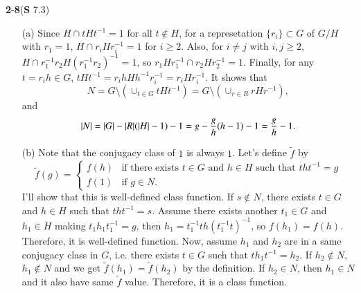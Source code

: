 \documentclass[a4paper, 12pt]{article}
\theoremstyle{Mydefinition}
\theoremstyle{Mytheorem}
\begin{document}
\noindent \textbf{2}-\textbf{8}(\textbf{S} 7.3)
\begin{enumerate}
    \item[(a)] Since $H\cap tHt^{-1} = 1$ for all $t\not\in H$, for a represetation $\{r_i\}\subset G$ of $G/H$ with $r_1 = 1$, $H\cap r_iHr_i^{-1} = 1$ for $i\geq 2$. Also, for $i\neq j$ with $i,j\geq 2$, $H\cap r_1^{-1}r_2H(r_1^{-1}r_2)^{-1} = 1$, so $r_1Hr_1^{-1}\cap r_2Hr_2^{-1} = 1$. Finally, for any $t = r_ih\in G$, $tHt^{-1} = r_ihHh^{-1}r_i^{-1} = r_iHr_i^{-1}$. It shows that
    \begin{equation}
        N = G\setminus\left(\cup_{t\in G}tHt^{-1}\right) = G\setminus\left(\cup_{r\in R}rHr^{-1}\right),
    \end{equation}
    and
    \begin{equation}
        \abs{N} = \abs{G}-\abs{R}(\abs{H}-1)-1 = g-\frac{g}{h}(h-1)-1 = \frac{g}{h}-1.
    \end{equation}
    \item[(b)] Note that the conjugacy class of $1$ is always $1$. Let's define $\tilde{f}$ by
    \begin{equation}
        \tilde{f}(g) = \begin{cases}
        f(h) & \textrm{if there exists $t\in G$ and $h\in H$ such that } tht^{-1} = g\\
        f(1) & \textrm{if $g\in N$}.
        \end{cases}
    \end{equation}
    I'll show that this is well-defined class function. If $s\not\in N$, there exists $t\in G$ and $h\in H$ such that $tht^{-1} = s$. Assume there exists another $t_1\in G$ and $h_1\in H$ making $t_1h_1t_1^{-1} = g$, then $h_1 = t_1^{-1}th(t_1^{-1}t)^{-1}$, so $f(h_1) = f(h)$. Therefore, it is well-defined function. Now, assume $h_1$ and $h_2$ are in a same conjugacy class in $G$, i.e. there exists $t\in G$ such that $th_1t^{-1} = h_2$. If $h_2\not\in N$, $h_1\not\in N$ and we get $\tilde{f}(h_1)=\tilde{f}(h_2)$ by the definition. If $h_2\in N$, then $h_1\in N$ and it also have same $\tilde{f}$ value. Therefore, it is a class function.
    

\end{enumerate}
\end{document}
